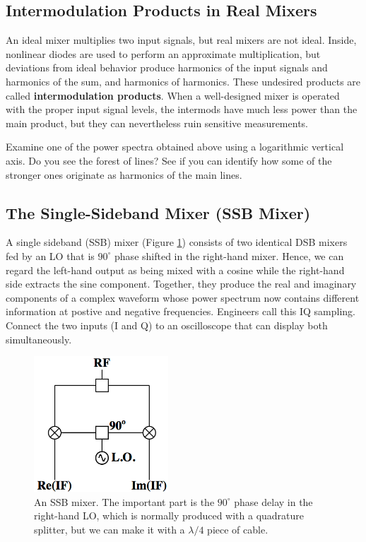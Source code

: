 \documentclass[11pt,preprint]{aastex}
\begin{document}
\subsection{Intermodulation Products in Real Mixers}

\noindent
An ideal mixer multiplies two input
signals, but real mixers are not ideal. Inside,
nonlinear diodes are used to perform an approximate multiplication, but
deviations from ideal behavior 
produce harmonics of the input signals and harmonics of the sum, and harmonics
of harmonics.
These undesired products are called
{\bf intermodulation products}.
When a well-designed
mixer is operated with the proper input signal levels, the intermods
have much less power than the main product, but they can nevertheless
ruin sensitive measurements.

Examine one of the power spectra obtained above using a logarithmic vertical
axis.
Do you see the forest of lines?
See if you can identify how some of the
stronger ones originate as harmonics of the main lines.

\subsection{ The Single-Sideband Mixer (SSB Mixer)}
\label{sectssb}

\noindent
A single sideband (SSB) mixer (Figure \ref{ssb}) 
consists of two identical
DSB mixers fed by an LO that is $90^\circ$ phase shifted in the right-hand mixer.
Hence, we can regard the left-hand output as being mixed with a cosine while
the right-hand side extracts the sine component.
Together, they produce the real and imaginary components of a complex waveform
whose power spectrum now contains different information
at postive and negative frequencies.
Engineers call this IQ sampling. Connect the two inputs
(I and Q) to an oscilloscope that can display both simultaneously.

\begin{figure}[h!]
\begin{center}
  \includegraphics[height=2in]{ssbmixer.png}
\end{center}
\caption{\footnotesize An SSB mixer. The important part is the
  $90^\circ$ phase delay in the right-hand LO, which is normally
  produced with a quadrature splitter, but we can make it
  with a $\lambda/4$ piece of cable. \label{ssb}}
\end{figure}
\end{document}
